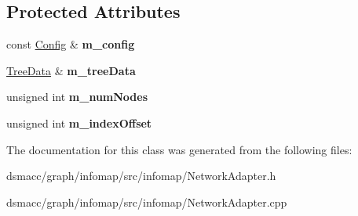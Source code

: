 \subsection*{Protected Attributes}
\begin{DoxyCompactItemize}
\item 
\mbox{\label{classNetworkAdapter_a22a3e67afbb0f6f654e7b5aea2b33c2e}} 
const \mbox{\hyperlink{structConfig}{Config}} \& {\bfseries m\+\_\+config}
\item 
\mbox{\label{classNetworkAdapter_a818972f0187b5a5bd0708e920505d2d0}} 
\mbox{\hyperlink{classTreeData}{Tree\+Data}} \& {\bfseries m\+\_\+tree\+Data}
\item 
\mbox{\label{classNetworkAdapter_a08d709edb951703ee5048413ddebe5a0}} 
unsigned int {\bfseries m\+\_\+num\+Nodes}
\item 
\mbox{\label{classNetworkAdapter_a8b106b9fb46ba1a167b0ed8e97b0d566}} 
unsigned int {\bfseries m\+\_\+index\+Offset}
\end{DoxyCompactItemize}


The documentation for this class was generated from the following files\+:\begin{DoxyCompactItemize}
\item 
dsmacc/graph/infomap/src/infomap/Network\+Adapter.\+h\item 
dsmacc/graph/infomap/src/infomap/Network\+Adapter.\+cpp\end{DoxyCompactItemize}
